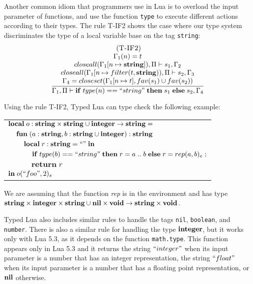 Another common idiom that programmers use in Lua is to overload
the input parameter of functions, and use the function \texttt{type}
to execute different actions according to their types.
The rule \textsc{T-IF2} shows the case where our type system
discriminates the type of a local variable base on the tag \texttt{string}:
\[
\begin{array}{c}
\; (\textsc{T-IF2})\\
\dfrac{\begin{array}{c}
       \Gamma_{1}(n) = t\\
       closeall(\Gamma_{1}[n \mapsto \mathbf{string}]), \Pi \vdash s_{1}, \Gamma_{2} \\
       closeall(\Gamma_{1}[n \mapsto filter(t, \mathbf{string})), \Pi \vdash s_{2}, \Gamma_{3}\\
       \Gamma_{4} = closeset(\Gamma_{1}[n \mapsto t], fav(s_{1}) \cup fav(s_{2}))
      \end{array}}
      {\Gamma_{1}, \Pi \vdash \mathbf{if} \; type(n) == ``string" \; \mathbf{then} \; s_{1} \; \mathbf{else} \; s_{2}, \Gamma_{4}}

\end{array}
\]

Using the rule \textsc{T-IF2}, Typed Lua can type check the following example:
\begin{center}
\begin{tabular}{llll}
\multicolumn{4}{l}{$\mathbf{local} \; o:\mathbf{string} \times \mathbf{string} \cup \mathbf{integer} \rightarrow \mathbf{string} =$}\\
& \multicolumn{3}{l}{$\mathbf{fun} \; (a:\mathbf{string}, b:\mathbf{string} \cup \mathbf{integer}):\mathbf{string}$}\\
& & \multicolumn{2}{l}{$\mathbf{local} \; r:\mathbf{string} = ``" \; \mathbf{in}$}\\
& & & \multicolumn{1}{l}{$\mathbf{if} \; type(b) == ``string" \; \mathbf{then} \; r = a \;{..}\;b \; \mathbf{else} \; r = rep(a, b)_{e}\; ;$}\\
& & & \multicolumn{1}{l}{$\mathbf{return} \; r$}\\
\multicolumn{4}{l}{$\mathbf{in} \; o(``foo", 2)_{s}$}
\end{tabular}
\end{center}

We are assuming that the function \emph{rep} is in the environment and has type
$\mathbf{string} \times \mathbf{integer} \times \mathbf{string} \cup \mathbf{nil} \times \mathbf{void} \rightarrow \mathbf{string} \times \mathbf{void}$.

Typed Lua also includes similar rules to handle the tags \texttt{nil},
\texttt{boolean}, and \texttt{number}.
There is also a similar rule for handling the type $\mathbf{integer}$, but
it works only with Lua 5.3, as it depends on the function \texttt{math.type}.
This function appears only in Lua 5.3 and it returns the string $``integer"$
when its input parameter is a number that has an integer representation,
the string $``float"$ when its input parameter is a number that has a
floating point representation, or $\mathbf{nil}$ otherwise.

